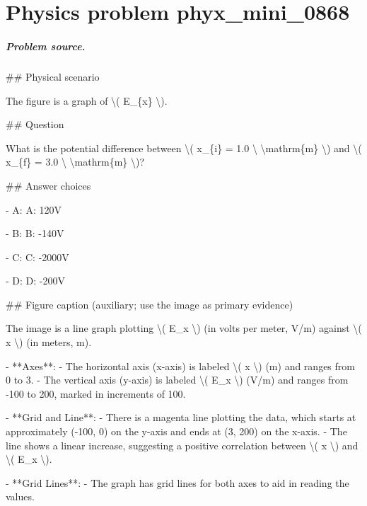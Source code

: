 
\chapter{Physics problem phyx\_mini\_0868}
\label{ch:PhyXMiniProblems_problem_phyx_mini_0868}

\paragraph{Problem source.}
\#\# Physical scenario

The figure is a graph of \textbackslash{}( E\_\{x\} \textbackslash{}).

\#\# Question

What is the potential difference between \textbackslash{}( x\_\{i\} = 1.0 \textbackslash{} \textbackslash{}mathrm\{m\} \textbackslash{}) and \textbackslash{}( x\_\{f\} = 3.0 \textbackslash{} \textbackslash{}mathrm\{m\} \textbackslash{})?

\#\# Answer choices

- A: A: 120V

- B: B: -140V

- C: C: -2000V

- D: D: -200V

\#\# Figure caption (auxiliary; use the image as primary evidence)

The image is a line graph plotting \textbackslash{}( E\_x \textbackslash{}) (in volts per meter, V/m) against \textbackslash{}( x \textbackslash{}) (in meters, m). 

- **Axes**: 
  - The horizontal axis (x-axis) is labeled \textbackslash{}( x \textbackslash{}) (m) and ranges from 0 to 3.
  - The vertical axis (y-axis) is labeled \textbackslash{}( E\_x \textbackslash{}) (V/m) and ranges from -100 to 200, marked in increments of 100.

- **Grid and Line**:
  - There is a magenta line plotting the data, which starts at approximately (-100, 0) on the y-axis and ends at (3, 200) on the x-axis.
  - The line shows a linear increase, suggesting a positive correlation between \textbackslash{}( x \textbackslash{}) and \textbackslash{}( E\_x \textbackslash{}).

- **Grid Lines**:
  - The graph has grid lines for both axes to aid in reading the values.


